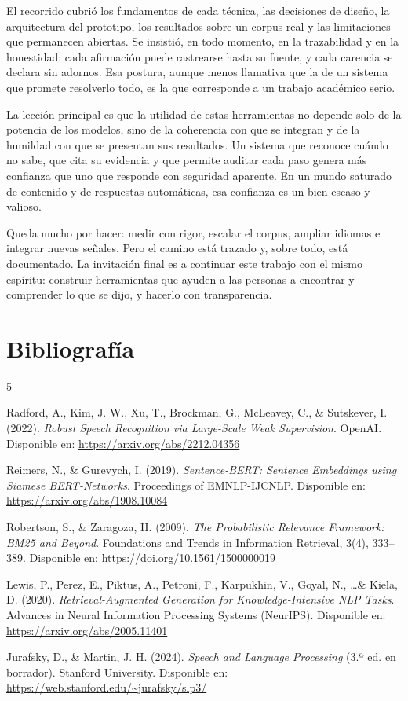 \documentclass[12pt,a4paper]{article}
\begin{document}
El recorrido cubrió los fundamentos de cada técnica, las decisiones de diseño, la arquitectura del prototipo, los resultados sobre un corpus real y las limitaciones que permanecen abiertas. Se insistió, en todo momento, en la trazabilidad y en la honestidad: cada afirmación puede rastrearse hasta su fuente, y cada carencia se declara sin adornos. Esa postura, aunque menos llamativa que la de un sistema que promete resolverlo todo, es la que corresponde a un trabajo académico serio.

La lección principal es que la utilidad de estas herramientas no depende solo de la potencia de los modelos, sino de la coherencia con que se integran y de la humildad con que se presentan sus resultados. Un sistema que reconoce cuándo no sabe, que cita su evidencia y que permite auditar cada paso genera más confianza que uno que responde con seguridad aparente. En un mundo saturado de contenido y de respuestas automáticas, esa confianza es un bien escaso y valioso.

Queda mucho por hacer: medir con rigor, escalar el corpus, ampliar idiomas e integrar nuevas señales. Pero el camino está trazado y, sobre todo, está documentado. La invitación final es a continuar este trabajo con el mismo espíritu: construir herramientas que ayuden a las personas a encontrar y comprender lo que se dijo, y hacerlo con transparencia.


\section{Bibliografía}
\label{sec:bibliografia}

\begin{thebibliography}{5}

Radford, A., Kim, J. W., Xu, T., Brockman, G., McLeavey, C., \& Sutskever, I. (2022).
\textit{Robust Speech Recognition via Large-Scale Weak Supervision}.
OpenAI. Disponible en: \url{https://arxiv.org/abs/2212.04356}

Reimers, N., \& Gurevych, I. (2019).
\textit{Sentence-BERT: Sentence Embeddings using Siamese BERT-Networks}.
Proceedings of EMNLP-IJCNLP. Disponible en: \url{https://arxiv.org/abs/1908.10084}

Robertson, S., \& Zaragoza, H. (2009).
\textit{The Probabilistic Relevance Framework: BM25 and Beyond}.
Foundations and Trends in Information Retrieval, 3(4), 333--389.
Disponible en: \url{https://doi.org/10.1561/1500000019}

Lewis, P., Perez, E., Piktus, A., Petroni, F., Karpukhin, V., Goyal, N., \ldots \& Kiela, D. (2020).
\textit{Retrieval-Augmented Generation for Knowledge-Intensive NLP Tasks}.
Advances in Neural Information Processing Systems (NeurIPS). Disponible en: \url{https://arxiv.org/abs/2005.11401}

Jurafsky, D., \& Martin, J. H. (2024).
\textit{Speech and Language Processing} (3.ª ed. en borrador).
Stanford University. Disponible en: \url{https://web.stanford.edu/~jurafsky/slp3/}

\end{thebibliography}
\end{document}

